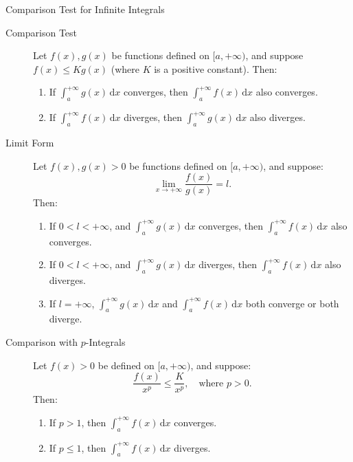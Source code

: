 \documentclass[11pt]{../../TexTemplate/elegantbook}
\begin{document}
\begin{theorem}{Comparison Test for Infinite Integrals}
\begin{description}
    \item[Comparison Test] Let \( f(x), g(x) \) be functions defined on \( [a, +\infty) \), 
        and suppose \( f(x) \leqslant K g(x) \) (where \( K \) is a positive constant). Then:
    \begin{enumerate}[label=\roman*)]
        \item If \( \int_{a}^{+\infty} g(x) \, \mathrm{d}x \) converges, 
            then \( \int_{a}^{+\infty} f(x) \, \mathrm{d}x \) also converges.
        \item If \( \int_{a}^{+\infty} f(x) \, \mathrm{d}x \) diverges, 
            then \( \int_{a}^{+\infty} g(x) \, \mathrm{d}x \) also diverges.
    \end{enumerate}

    \item[Limit Form] Let \( f(x), g(x) > 0 \) be functions defined on \( [a, +\infty) \), and suppose:
    \[
    \lim_{x \to +\infty} \frac{f(x)}{g(x)} = l.
    \]
    Then:
    \begin{enumerate}[label=\roman*)]
        \item If \( 0 < l < +\infty \), and \( \int_{a}^{+\infty} g(x) \, \mathrm{d}x \) converges, 
            then \( \int_{a}^{+\infty} f(x) \, \mathrm{d}x \) also converges.
        \item If \( 0 < l < +\infty \), and \( \int_{a}^{+\infty} g(x) \, \mathrm{d}x \) diverges, 
            then \( \int_{a}^{+\infty} f(x) \, \mathrm{d}x \) also diverges.
        \item If \( l = +\infty \), \( \int_{a}^{+\infty} g(x) \, \mathrm{d}x \) 
            and \( \int_{a}^{+\infty} f(x) \, \mathrm{d}x \) both converge or both diverge.
    \end{enumerate}

    \item[Comparison with \( p \)-Integrals] Let \( f(x) > 0 \) be defined on \( [a, +\infty) \), and suppose:
    \[
    \frac{f(x)}{x^p} \leqslant \frac{K}{x^p}, \quad \text{where } p > 0.
    \]
    Then:
    \begin{enumerate}[label=\roman*)]
        \item If \( p > 1 \), then \( \int_{a}^{+\infty} f(x) \, \mathrm{d}x \) converges.
        \item If \( p \leqslant 1 \), then \( \int_{a}^{+\infty} f(x) \, \mathrm{d}x \) diverges.
    \end{enumerate}


\end{description}
\end{theorem}
\end{document}
